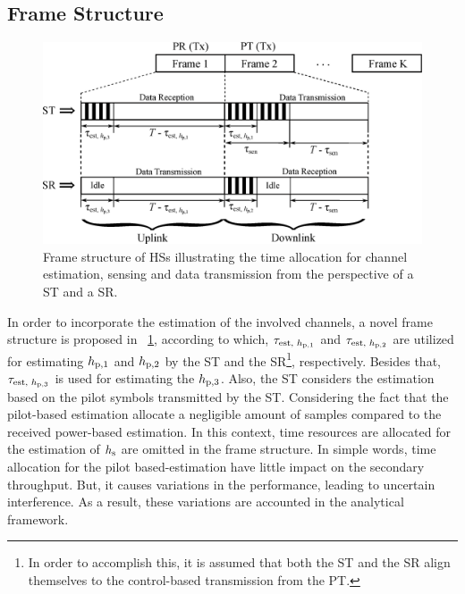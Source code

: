 \subsection{Frame Structure}
\begin{figure}[!t]
\centering
\includegraphics[width = \figscalett]{figures/Frame_Structure}
\caption{Frame structure of HSs illustrating the time allocation for channel estimation, sensing and data transmission from the perspective of a ST and a SR.} 
\label{fig_HS:fs}
\end{figure}
In order to incorporate the estimation of the involved channels, a novel frame structure is proposed in \figurename~\ref{fig_HS:fs}, according to which, $\tau_{\text{est, $h_{\text{p,1}}$}}$ and $\tau_{\text{est, $h_{\text{p,2}}$}}$ are utilized for estimating $h_{\text{p,1}}$ and $h_{\text{p,2}}$ by the ST and the SR\footnote{In order to accomplish this, it is assumed that both the ST and the SR align themselves to the control-based transmission from the PT.}, respectively. Besides that, $\tau_{\text{est, $h_{\text{p,3}}$}}$ is used for estimating the $h_{\text{p,3}}$. Also, the ST considers the estimation based on the pilot symbols transmitted by the ST. Considering the fact that the pilot-based estimation allocate a negligible amount of samples compared to the received power-based estimation. In this context, time resources are allocated for the estimation of $h_{\text{s}}$ are omitted in the frame structure. In simple words, time allocation for the pilot based-estimation have little impact on the secondary throughput. But, it causes variations in the performance, leading to uncertain interference. As a result, these variations are accounted in the analytical framework. 

